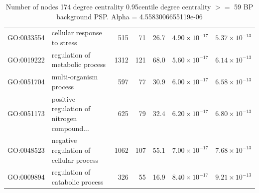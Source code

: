 \begin{table}[ht]
\begin{adjustbox}{max width=\textwidth}
\begin{tabular}{llrrrrr}
  GO:0033554 & cellular response to stress & 515 & 71 & 26.7 & $4.90 \times 10^{-17}$ & $5.37 \times 10^{-13}$ \\ 
  GO:0019222 & regulation of metabolic process & 1312 & 121 & 68.0 & $5.60 \times 10^{-17}$ & $6.14 \times 10^{-13}$ \\ 
  GO:0051704 & multi-organism process & 597 & 77 & 30.9 & $6.00 \times 10^{-17}$ & $6.58 \times 10^{-13}$ \\ 
  GO:0051173 & positive regulation of nitrogen compound... & 625 & 79 & 32.4 & $6.20 \times 10^{-17}$ & $6.80 \times 10^{-13}$ \\ 
  GO:0048523 & negative regulation of cellular process & 1062 & 107 & 55.1 & $7.00 \times 10^{-17}$ & $7.68 \times 10^{-13}$ \\ 
  GO:0009894 & regulation of catabolic process & 326 & 55 & 16.9 & $8.40 \times 10^{-17}$ & $9.21 \times 10^{-13}$ \\ 
   \hline
\end{tabular}
\end{adjustbox}
\caption{Number of nodes 174 degree centrality 0.95centile  degree centrality $>=$ 59 BP background PSP. Alpha = 4.5583006655119e-06} 
\label{tab:Number of nodes 174 degree centrality 0.95centile  degree centrality >= 59 BP background PSP. Alpha = 4.5583006655119e-06}
\end{table}




